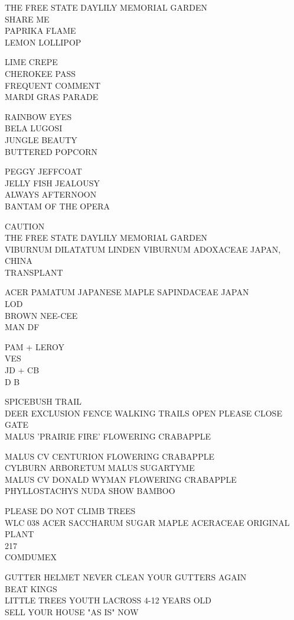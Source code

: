 \documentclass[10pt,letterpaper]{article}
\begin{document}
THE FREE STATE DAYLILY MEMORIAL GARDEN\\
SHARE ME\\
PAPRIKA FLAME\\
LEMON LOLLIPOP

LIME CREPE\\
CHEROKEE PASS\\
FREQUENT COMMENT\\
MARDI GRAS PARADE

RAINBOW EYES\\
BELA LUGOSI\\
JUNGLE BEAUTY\\
BUTTERED POPCORN

PEGGY JEFFCOAT\\
JELLY FISH JEALOUSY\\
ALWAYS AFTERNOON\\
BANTAM OF THE OPERA

CAUTION\\
THE FREE STATE DAYLILY MEMORIAL GARDEN\\
VIBURNUM DILATATUM LINDEN VIBURNUM ADOXACEAE JAPAN, CHINA\\
TRANSPLANT

ACER PAMATUM JAPANESE MAPLE SAPINDACEAE JAPAN\\
LOD\\
BROWN NEE{-}CEE\\
MAN DF

PAM + LEROY\\
VES\\
JD + CB\\
D B

SPICEBUSH TRAIL\\
DEER EXCLUSION FENCE WALKING TRAILS OPEN PLEASE CLOSE GATE\\
MALUS 'PRAIRIE FIRE' FLOWERING CRABAPPLE

MALUS CV CENTURION FLOWERING CRABAPPLE\\
CYLBURN ARBORETUM MALUS SUGARTYME\\
MALUS CV DONALD WYMAN FLOWERING CRABAPPLE\\
PHYLLOSTACHYS NUDA SHOW BAMBOO

PLEASE DO NOT CLIMB TREES\\
WLC 038 ACER SACCHARUM SUGAR MAPLE ACERACEAE ORIGINAL PLANT\\
217\\
COMDUMEX

GUTTER HELMET NEVER CLEAN YOUR GUTTERS AGAIN\\
BEAT KINGS\\
LITTLE TREES YOUTH LACROSS 4{-}12 YEARS OLD\\
SELL YOUR HOUSE "AS IS" NOW
\end{document}
